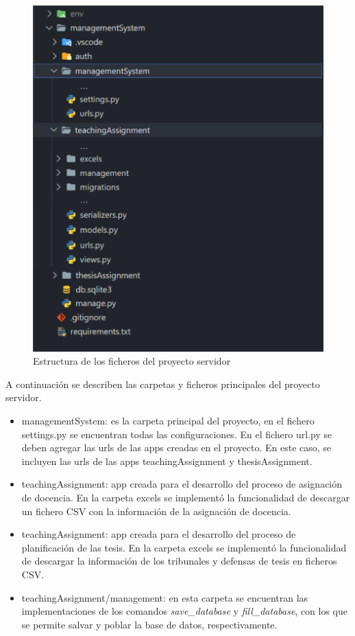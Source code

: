\begin{figure}[H]
    \includegraphics[scale=0.18]{Graphics/Extensibility/server-structure.png}
    \caption{Estructura de los ficheros del proyecto servidor}
    \label{img-server-structure}
\end{figure}


A continuación se describen las carpetas y ficheros principales del proyecto 
servidor.

\begin{itemize}
    \item managementSystem: es la carpeta principal del proyecto, en el fichero settings.py se encuentran
    todas las configuraciones. En el fichero url.py se deben agregar las urls de las apps creadas 
    en el proyecto. En este caso, se incluyen las urls de las apps teachingAssignment y thesisAssignment. 
    \item teachingAssignment:  app creada para el desarrollo del proceso de asignación de docencia. En la carpeta excels 
    se implementó la funcionalidad de descargar un fichero CSV con la información de la asignación de docencia. 
    \item teachingAssignment:  app creada para el desarrollo del proceso de planificación de las tesis. En la carpeta excels 
    se implementó la funcionalidad de descargar la información de los tribunales y defensas de tesis en ficheros CSV.
    \item teachingAssignment/management: en esta carpeta se encuentran las implementaciones de los comandos \textit{save\_database} 
    y \textit{fill\_database}, con los que se permite salvar y poblar la base de datos, respectivamente.
\end{itemize}


